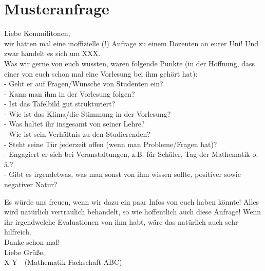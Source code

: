 \chapter{Musteranfrage}\thispagestyle{fancy}\label{chp:musteranfrage}
\begin{center}
    \parbox{0.9\textwidth}{\ttfamily
        Liebe Kommilitonen,\medskip\\
        wir hätten mal eine inoffizielle (!) Anfrage zu einem Dozenten an eurer Uni! Und zwar handelt es sich um XXX.\medskip\\
        Was wir gerne von euch wüssten, wären folgende Punkte (in der Hoffnung, dass einer von euch schon mal eine Vorlesung bei ihm gehört hat):\smallskip\\
        - Geht er auf Fragen/Wünsche von Studenten ein?\\
        - Kann man ihm in der Vorlesung folgen?\\
        - Ist das Tafelbild gut strukturiert?\\
        - Wie ist das Klima/die Stimmung in der Vorlesung?\\
        - Was haltet ihr insgesamt von seiner Lehre?\\
        - Wie ist sein Verhältnis zu den Studierenden?\\
        - Steht seine Tür jederzeit offen (wenn man Probleme/Fragen hat)?\\
        - Engagiert er sich bei Veranstaltungen, z.B. für Schüler, Tag der Mathematik o.\,ä.?\\
        - Gibt es irgendetwas, was man sonst von ihm wissen sollte, positiver sowie negativer Natur?\smallskip}

    \parbox{0.9\textwidth}{\ttfamily Es würde uns freuen, wenn wir dazu ein paar Infos von euch haben könnte! Alles wird natürlich vertraulich behandelt, so wie hoffentlich auch diese Anfrage! Wenn ihr irgendwelche Evaluationen von ihm habt, wäre das natürlich auch sehr hilfreich.\medskip\\
        Danke schon mal!\medskip\\
        Liebe Grüße,\\
        X Y\ \ (Mathematik Fachschaft ABC)
    }
\end{center}

